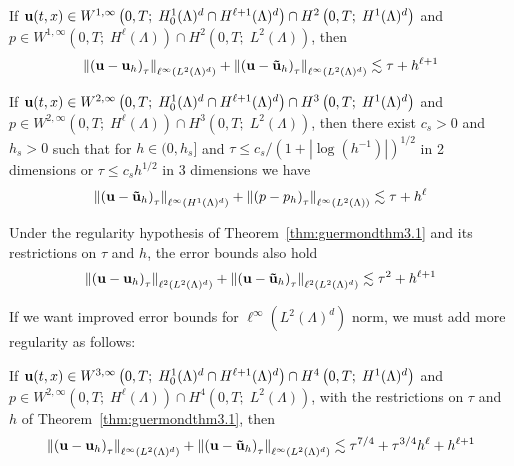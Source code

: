 \documentclass[letterpaper]{erdc}
\begin{document}
\begin{theorem}\label{thm:guermondthm3.1}
If $\textbf{u}(t,x)\in W^{1,\infty}\left(0,T;\; H_0^1(\Lambda)^d \cap H^{\ell+1}(\Lambda)^d  \right) \cap H^2\left(0,T;\; H^1(\Lambda)^d\right)$ and $p\in W^{1,\infty}\left(0,T;\; H^{\ell}(\Lambda) \right)\cap H^2\left(0,T;\; L^2(\Lambda)\right)$, then
  \begin{equation}
    \left\| \left(\textbf{u} - \textbf{u}_h \right)_{\tau} \right\|_{\ell^{\infty}\left(L^2(\Lambda)^d\right)} + \left\| \left(\textbf{u} - \mathbf{\tilde{u}}_h \right)_{\tau} \right\|_{\ell^{\infty}\left(L^2(\Lambda)^d\right)} \lesssim \tau + h^{\ell+1}
  \end{equation}
\end{theorem}

\begin{theorem}\label{thm:guermondthm3.2}
If $\textbf{u}(t,x)\in W^{2,\infty}\left(0,T;\; H_0^1(\Lambda)^d \cap H^{\ell+1}(\Lambda)^d  \right) \cap H^3\left(0,T;\; H^1(\Lambda)^d\right)$ and $p\in W^{2,\infty}\left(0,T;\; H^{\ell}(\Lambda) \right)\cap H^3\left(0,T;\; L^2(\Lambda)\right)$, then there exist $c_s>0$ and $h_s>0$ such that for $h\in (0,h_s]$ and $\tau \leq c_s /\left(1+|\log(h^{-1})| \right)^{1/2}$ in 2 dimensions or $\tau \leq c_s h^{1/2}$ in 3 dimensions we have
  \begin{equation}
    \left\| \left(\textbf{u} - \mathbf{\tilde{u}}_h \right)_{\tau} \right\|_{\ell^{\infty}\left(H^1(\Lambda)^d\right)} + \left\| \left(p - p_h \right)_{\tau} \right\|_{\ell^{\infty}\left(L^2(\Lambda)\right)} \lesssim \tau + h^{\ell}
  \end{equation}
\end{theorem}

\begin{theorem}\label{thm:guermondthm3.3}
Under the regularity hypothesis of Theorem~\ref{thm:guermondthm3.1} and its restrictions on $\tau$ and $h$, the error bounds also hold
    \begin{equation}
      \left\| \left(\textbf{u} - \textbf{u}_h \right)_{\tau} \right\|_{\ell^{2}\left(L^2(\Lambda)^d\right)} + \left\| \left(\textbf{u} - \mathbf{\tilde{u}}_h \right)_{\tau} \right\|_{\ell^{2}\left(L^2(\Lambda)^d\right)} \lesssim \tau^2 + h^{\ell+1}
    \end{equation}
\end{theorem}

If we want improved error bounds for $\ell^{\infty}\left( L^2(\Lambda)^d \right)$ norm, we must add more regularity as follows:
\begin{theorem}\label{thm:guermondthm3.4}
If $\textbf{u}(t,x)\in W^{3,\infty}\left(0,T;\; H_0^1(\Lambda)^d \cap H^{\ell+1}(\Lambda)^d  \right) \cap H^4\left(0,T;\; H^1(\Lambda)^d\right)$ and $p\in W^{2,\infty}\left(0,T;\; H^{\ell}(\Lambda) \right)\cap H^4\left(0,T;\; L^2(\Lambda)\right)$, with the restrictions on $\tau$ and $h$ of Theorem~\ref{thm:guermondthm3.1}, then
  \begin{equation}
    \left\| \left(\textbf{u} - \textbf{u}_h \right)_{\tau} \right\|_{\ell^{\infty}\left(L^2(\Lambda)^d\right)} + \left\| \left(\textbf{u} - \mathbf{\tilde{u}}_h \right)_{\tau} \right\|_{\ell^{\infty}\left(L^2(\Lambda)^d\right)} \lesssim \tau^{7/4} + \tau^{3/4}h^{\ell} + h^{\ell+1}
  \end{equation}
\end{theorem}
\end{document}
